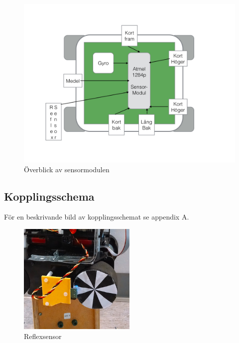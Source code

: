 \documentclass[a4paper,12pt,fleqn]{article}
\begin{document}
\begin{figure}[htp] %
  \begin{center}
  \includegraphics[keepaspectratio=true,width=\linewidth]{bilder/overblicksensor}  %
  \end{center}
  \caption{Överblick av sensormodulen} %
  \label{fig:sensoroverview}
\end{figure}

\subsection{Kopplingsschema}

För en beskrivande bild av kopplingsschemat se appendix A.

\begin{figure}[htp] %
  \begin{center}
  \includegraphics[keepaspectratio=true,width=0.5\textwidth]{../Kappa/reflexsensor.png}  %
  \end{center}
  \caption{Reflexsensor} %
  \label{fig:reflex} %
\end{figure}
\end{document}
